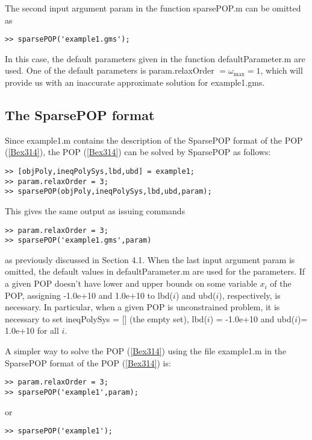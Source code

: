 The second input argument {\sf param} in the function  sparsePOP.m  can be omitted as 
\begin{verbatim}
>> sparsePOP('example1.gms');
\end{verbatim}
In this case, the default parameters given in the function  defaultParameter.m are 
used. %
One of the default parameters is  {\sf param.relaxOrder} $=\omega_{\max} = 1$,
which will 
provide us with 
an inaccurate approximate solution for example1.gms. 

\subsection{The SparsePOP format}

Since example1.m contains the description of the SparsePOP format  of the POP (\ref{Bex314}), 
the POP (\ref{Bex314}) can be solved by SparsePOP as follows:
\begin{verbatim}
>> [objPoly,ineqPolySys,lbd,ubd] = example1; 
>> param.relaxOrder = 3; 
>> sparsePOP(objPoly,ineqPolySys,lbd,ubd,param);
\end{verbatim}
This gives  the same output as  issuing commands 
\begin{verbatim}
>> param.relaxOrder = 3; 
>> sparsePOP('example1.gms',param)
\end{verbatim}
as previously discussed in Section 4.1.
When the last input argument  {\sf param} 
is omitted, the default values in 
defaultParameter.m are used for the parameters. 
If a given POP doesn't have lower and upper bounds on some variable  $x_i$ of the POP,  
assigning -1.0e+10 and 1.0e+10 to {\sf lbd(}$i${\sf )} and {\sf ubd(}$i${\sf )}, respectively,
is necessary. In particular, 
when a 
given POP is unconstrained problem, it is necessary to set {\sf ineqPolySys = []} (the empty set), 
{\sf lbd(}$i${\sf ) = -1.0e+10} and 
{\sf ubd(}$i${\sf )= 1.0e+10} for all $i$.

A simpler way to solve  the POP (\ref{Bex314}) using the 
 file  example1.m in the SparsePOP format  of  the POP (\ref{Bex314}) is: 
\begin{verbatim}
>> param.relaxOrder = 3; 
>> sparsePOP('example1',param);
\end{verbatim}
or
\begin{verbatim}
>> sparsePOP('example1');
\end{verbatim}

